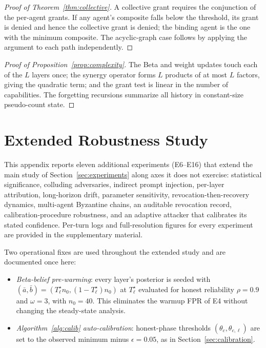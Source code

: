 \documentclass[sigconf,anonymous]{acmart}
\theoremstyle{plain}
\theoremstyle{definition}
\theoremstyle{remark}
\begin{document}
\begin{proof}[Proof of Theorem~\ref{thm:collective}]
A collective grant requires the conjunction of the per-agent grants. If any agent's
composite falls below the threshold, its grant is denied and hence the collective grant is
denied; the binding agent is the one with the minimum composite. The acyclic-graph case
follows by applying the argument to each path independently.
\end{proof}

\begin{proof}[Proof of Proposition~\ref{prop:complexity}]
The Beta and weight updates touch each of the $L$ layers once; the synergy operator forms
$L$ products of at most $L$ factors, giving the quadratic term; and the grant test is
linear in the number of capabilities. The forgetting recursions summarize all history in
constant-size pseudo-count state.
\end{proof}

\section{Extended Robustness Study}
\label{app:robustness_ext}
This appendix reports eleven additional experiments (E6--E16) that extend
the main study of Section~\ref{sec:experiments} along axes it does not
exercise: statistical significance, colluding adversaries, indirect
prompt injection, per-layer attribution, long-horizon drift, parameter
sensitivity, revocation-then-recovery dynamics, multi-agent Byzantine
chains, an auditable revocation record, calibration-procedure
robustness, and an adaptive attacker that calibrates its stated
confidence.  Per-turn logs and full-resolution figures for every
experiment are provided in the supplementary material.

Two operational fixes are used throughout the extended study and are
documented once here:

\begin{itemize}[leftmargin=1.4em,topsep=2pt,itemsep=1pt]
\item \emph{Beta-belief pre-warming}: every layer's posterior is seeded
  with $(\bar a,\bar b)=(T^\star_\ell n_0,(1-T^\star_\ell)n_0)$ at
  $T^\star_\ell$ evaluated for honest reliability $\rho=0.9$ and $\omega=3$,
  with $n_0=40$.  This eliminates the warmup FPR of E4 without changing
  the steady-state analysis.
\item \emph{Algorithm~\ref{alg:calib} auto-calibration}: honest-phase
  thresholds $(\theta_c,\theta_{c,\ell})$ are set to the observed minimum
  minus $\epsilon=0.05$, as in Section~\ref{sec:calibration}.
\end{itemize}
\end{document}
